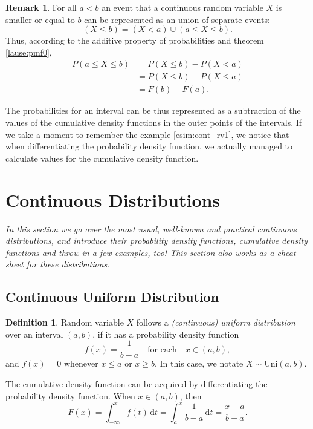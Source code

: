 \documentclass[12pt,a4paper,leqno]{report}
\newcommand{\dif}{\,\mathrm{d}}
\theoremstyle{plain}
\theoremstyle{definition}
\newtheorem{maar}[equation]{Definition}
\newtheorem{remark}[equation]{Remark}
\begin{document}
\begin{remark}
For all $a<b$ an event that a continuous random variable $X$ is smaller or equal to $b$ can be represented as an union of separate events:
\[
(X \leq b) = (X < a) \cup (a \leq X \leq b).
\]
Thus, according to the additive property of probabilities and theorem \ref{lause:pmf0},
\[
\begin{split}
P(a \leq X \leq b) &= P(X \leq b)- P(X < a) \\
				     &= P(X \leq b)- P(X \leq a) \\
				     &= F(b) - F(a).
\end{split}
\]
\end{remark} 

The probabilities for an interval can be thus represented as a subtraction of the values of the cumulative density functions in the outer points of the intervals. If we take a moment to remember the example \ref{esim:cont_rv1}, we notice that when differentiating the probability density function, we actually managed to calculate values for the cumulative density function.

\section{Continuous Distributions}

\emph{In this section we go over the most usual, well-known and practical continuous distributions, and introduce their probability density functions, cumulative density functions and throw in a few examples, too! This section also works as a cheat-sheet for these distributions.}

\subsection{Continuous Uniform Distribution}\label{cont_uniform_distr}

\begin{maar}
Random variable $X$ follows a \emph{(continuous) uniform distribution} over an interval $(a,b)$, if it has a probability density function 
\[
f(x) = \frac{1}{b-a} \quad \text{for each} \quad x \in (a,b),
\] 
and $f(x)=0$ whenever $x \leq a$ or $x \geq b$. In this case, we notate $X \sim \text{Uni}(a,b).$
\end{maar}

The cumulative density function can be acquired by differentiating the probability density function. When $x \in (a,b)$, then
\[
F(x) = \int_{-\infty}^x f(t) \dif{t} = \int_a^x \frac{1}{b-a} \dif{t} = \frac{x-a}{b-a}.
\]
\end{document}
